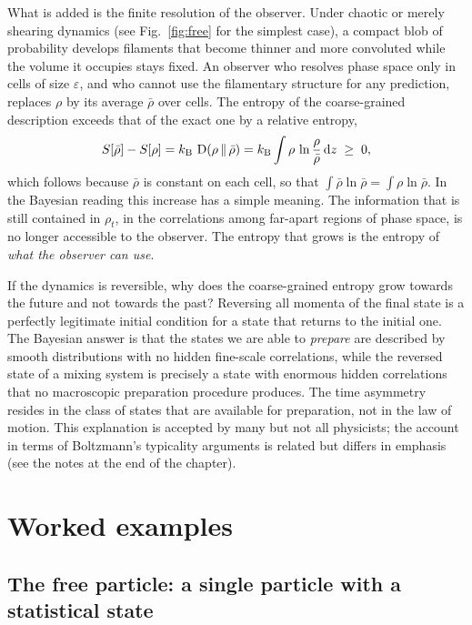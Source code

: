What is added is the finite resolution of the observer. Under chaotic or merely shearing dynamics (see Fig.~\ref{fig:free} for the simplest case), a compact blob of probability develops filaments that become thinner and more convoluted while the volume it occupies stays fixed. An observer who resolves phase space only in cells of size $\varepsilon$, and who cannot use the filamentary structure for any prediction, replaces $\rho$ by its average $\bar\rho$ over cells. The entropy of the coarse-grained description exceeds that of the exact one by a relative entropy,
\begin{equation}
S[\bar\rho]-S[\rho]=k_{\mathrm B}\,\operatorname{D}(\rho\,\|\,\bar\rho)=k_{\mathrm B}\int\rho\,\ln\frac{\rho}{\bar\rho}\,\mathrm{d} z\;\ge\;0,
\end{equation}
which follows because $\bar\rho$ is constant on each cell, so that $\int\bar\rho\ln\bar\rho=\int\rho\ln\bar\rho$. In the Bayesian reading this increase has a simple meaning. The information that is still contained in $\rho_t$, in the correlations among far-apart regions of phase space, is no longer accessible to the observer. The entropy that grows is the entropy of \emph{what the observer can use}.

\begin{remark}
If the dynamics is reversible, why does the coarse-grained entropy grow towards the future and not towards the past? Reversing all momenta of the final state is a perfectly legitimate initial condition for a state that returns to the initial one. The Bayesian answer is that the states we are able to \emph{prepare} are described by smooth distributions with no hidden fine-scale correlations, while the reversed state of a mixing system is precisely a state with enormous hidden correlations that no macroscopic preparation procedure produces. The time asymmetry resides in the class of states that are available for preparation, not in the law of motion. This explanation is accepted by many but not all physicists; the account in terms of Boltzmann's typicality arguments is related but differs in emphasis (see the notes at the end of the chapter).
\end{remark}

\section{Worked examples}
\label{sec:examples}

\subsection{The free particle: a single particle with a statistical state}
\label{sec:free}

